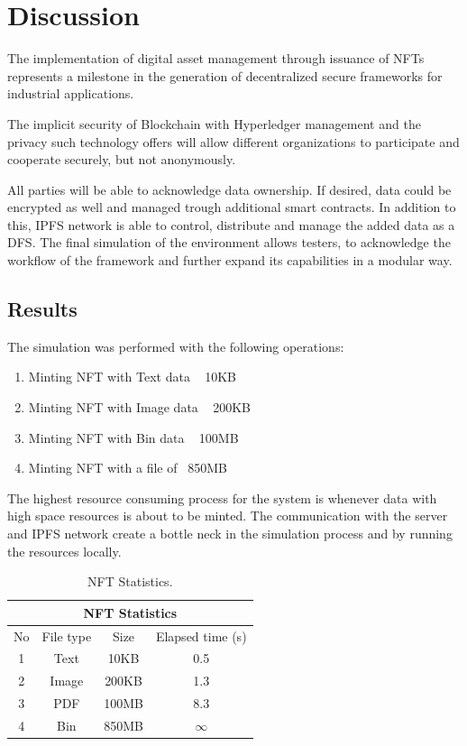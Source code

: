 
\chapter{Discussion}
\label{ch:discussion}
The implementation of digital asset management through issuance of \ac{NFT}s represents a milestone in the generation of decentralized secure frameworks for industrial applications.

The implicit security of Blockchain with Hyperledger management and the privacy such technology offers will allow different organizations to participate and cooperate securely, but not anonymously. 

All parties will be able to acknowledge data ownership. If desired, data could be encrypted as well and managed trough additional smart contracts. In addition to this, \ac{IPFS} network is able to control, distribute and manage the added data as a \ac{DFS}. The final simulation of the environment allows testers, to acknowledge the workflow of the framework and further expand its capabilities in a modular way.

\section{Results}
The simulation was performed with the following operations:

\begin{enumerate}
    \item Minting NFT with Text data ~ 10KB
    \item Minting NFT with Image data ~ 200KB
    \item Minting NFT with Bin data ~ 100MB
    \item Minting NFT with a file of ~850MB
\end{enumerate}

The highest resource consuming process for the system is whenever data with high space resources is about to be minted. The communication with the server and IPFS network create a bottle neck in the simulation process and by running the resources locally.

\begin{table}[h!]
\begin{center}
\begin{tabular}{ |c|c|c|c|  }
 \hline
 \multicolumn{4}{|c|}{NFT Statistics} \\
 \hline
 No & File type & Size  & Elapsed time (s)\\
 \hline
 1   & Text     & 10KB &   0.5  \\
 2   & Image    & 200KB &   1.3 \\
 3   & PDF      & 100MB &   8.3 \\
 4   & Bin      & 850MB &   $\infty$ \\
 
 \hline
\end{tabular}
\caption{NFT Statistics.}
\label{table:NFTStats}
\end{center}
\end{table}

